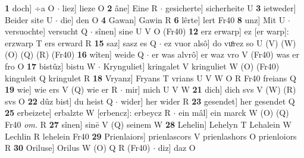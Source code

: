 \documentclass[8pt,a4paper,notitlepage]{article}
\begin{document}
\begin{table}[ht]
\begin{minipage}[t]{0.5\linewidth}
\textbf{1} doch] ÷a O  $\cdot$ liez] lieze O \textbf{2} âne] Eine R  $\cdot$ gesicherte] sicherheite U \textbf{3} ietweder] Beider site U  $\cdot$ die] den O \textbf{4} Gawan] Gawin R \textbf{6} lêrte] lert Fr40 \textbf{8} unz] Mit U  $\cdot$ versuochte] versucht Q  $\cdot$ sînen] sine U V O (Fr40) \textbf{12} erz erwarp] ez [er warp]: erzwarp T ers erward R \textbf{15} saz] sasz es Q  $\cdot$ ez vuor alsô] do vuͦrez so U (V) (W) (O) (Q) (R) (Fr40) \textbf{16} wîten] weide Q  $\cdot$ er was alvrô] er waz vro V (Fr40) was er fro O \textbf{17} bistûz] bistu W  $\cdot$ Krynguliet] kringalet V kringuliet W (O) (Fr40) kinguleit Q kringulet R \textbf{18} Vryanz] Fryans T vrians U V W O R Fr40 freians Q \textbf{19} wie] wie ers V (Q) wie er R  $\cdot$ mir] mich U V W \textbf{21} dich] dich svs V (W) (R) svs O \textbf{22} dûz bist] du heist Q  $\cdot$ wider] her wider R \textbf{23} gesendet] her gesendet Q \textbf{25} erbeizete] erbalzte W [erbencz]: erbeycz R  $\cdot$ ein mâl] ein marck W (O) (Q) Fr40 \textit{om.} R \textbf{27} sînen] sinē V (Q) seinem W \textbf{28} Lehelin] Lehelyn T Lehalein W Lechlin R lehelein Fr40 \textbf{29} Prienlaiors] prienlascors V prienlashors O prienloiors R \textbf{30} Oriluse] Orilus W (O) Q R (Fr40)  $\cdot$ diz] daz O \newline
\end{minipage}
\end{table}
\end{document}
